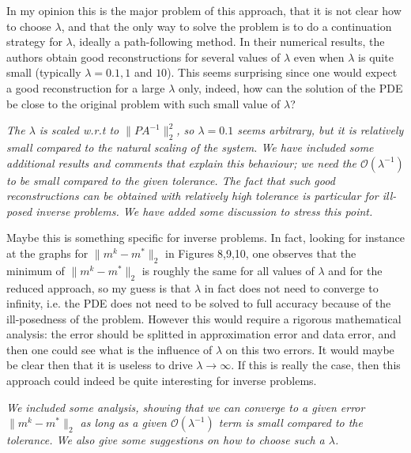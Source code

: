 \documentclass[12pt]{article}
\begin{document}
\vspace{5mm}

In my opinion this is the major problem of this approach, that it is not clear how to choose $\lambda$, and that the only way to solve the problem is to do a continuation strategy for $\lambda$, ideally a path-following method. In their numerical results, the authors obtain good reconstructions for several values of $\lambda$ even when $\lambda$ is quite small (typically $\lambda=0.1,1$ and $10$). This seems surprising since one would expect a good reconstruction for a large $\lambda$ only, indeed, how can the solution of the PDE be close to the original problem with such small value of $\lambda$? 

\vspace{5mm}

\emph{The $\lambda$ is scaled w.r.t to $\|PA^{-1}\|^2_2$, so $\lambda=0.1$ seems arbitrary, but it is relatively small compared to the natural scaling of the system. We have included some additional results and comments that explain this behaviour; we need the $\mathcal{O}(\lambda^{-1})$ to be small compared to the given tolerance. The fact that such good reconstructions can be obtained with relatively high tolerance is particular for ill-posed inverse problems. We have added some discussion to stress this point.}

\vspace{5mm}

Maybe this is something specific for inverse problems. In fact, looking for instance at the graphs for $\|m^k - m^*\|_2$ in Figures 8,9,10, one observes that the minimum of $\|m^k - m^*\|_2$ is roughly the same for all values of $\lambda$ and for the reduced approach, so my guess is that $\lambda$ in fact does not need to converge to infinity, i.e. the PDE does not need to be solved to full accuracy because of the ill-posedness of the problem. However this would require a rigorous mathematical analysis: the error should be splitted in approximation error and data error, and then one could see what is the influence of $\lambda$ on this two errors. It would maybe be clear then that it is useless to drive $\lambda\to\infty$. If this is really the case, then this approach could indeed be quite interesting for inverse problems. 

\vspace{5mm}

\emph{We included some analysis, showing that we can converge to a given error $\|m^k - m^*\|_2$ as long as a given $\mathcal{O}(\lambda^{-1})$ term is small compared to the tolerance. We also give some suggestions on how to choose such a $\lambda$.}
\end{document}
